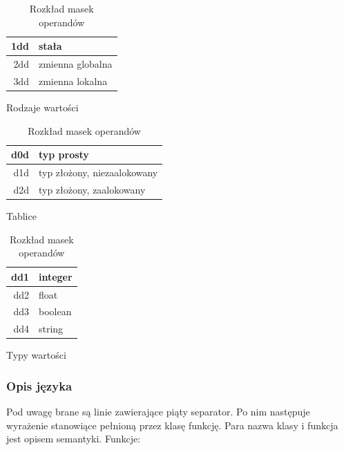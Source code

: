 \documentclass[a4paper,12pt]{article}
\begin{document}

\begin{table}[h!]
\centering

\begin{minipage}{5.5cm}
\centering
\begin{tabular}{|r|l|}
  \hline 
  1dd & stała\\
  \hline
  2dd & zmienna globalna \\
  \hline
  3dd & zmienna lokalna \\
  \hline
\end{tabular} 
\caption{Rodzaje wartości}
\end{minipage}
\begin{minipage}{5.5cm}
\centering
\begin{tabular}{|r|l|}
  \hline 
  d0d & typ prosty\\
  \hline
  d1d & typ złożony, niezaalokowany \\
  \hline
  d2d & typ złożony, zaalokowany \\
  \hline
\end{tabular} 
\caption{Tablice}
\end{minipage}
\begin{minipage}{5.5cm}
\centering
\begin{tabular}{|r|l|}
  \hline 
  dd1 & integer\\
  \hline
  dd2 & float \\
  \hline
  dd3 & boolean \\
  \hline
  dd4 & string \\
  \hline
\end{tabular} 
\caption{Typy wartości}
\end{minipage}

\caption{Rozkład masek operandów}
\end{table}


\subsubsection{Opis języka}
Pod uwagę brane są linie zawierające piąty separator. Po nim następuje wyrażenie stanowiące pełnioną przez klasę funkcję. Para nazwa klasy i funkcja jest opisem semantyki. Funkcje:
\end{document}
